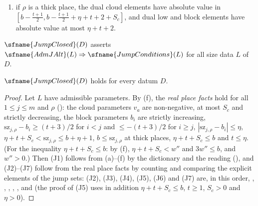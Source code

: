 \begin{definition}
\begin{enumerate}[label=(J\arabic*),leftmargin=*]
dual low elements lie in $[-\eta-\frac{t+1}2,\eta-\frac{t+1}2]$, $0$ is not a dual jump, and the negative dual jumps number $m-j$,
resp.\ $k-1+j$;
\item\label{pf:sh-theta:J7} if $\rho$ is a thick place, the dual cloud elements have absolute value in
$[b-\frac{t+1}2,b-\frac{t+1}2+\eta+t+2+S_c]$, and dual low and block elements have absolute value at most $\eta+t+2$.
\end{enumerate}
$\sfname{JumpClosed}(D)$ asserts $\sfname{AdmJAlt}(L)\Rightarrow\sfname{JumpConditions}(L)$ for all size data $L$ of $D$.
\end{definition}

\begin{theorem}\label{pf:sh-theta:jump}
$\sfname{JumpClosed}(D)$ holds for every datum $D$.
\end{theorem}

\begin{proof}
Let $L$ have admissible parameters. By (f), the \emph{real place facts} hold for all $1\le j\le m$ and $\rho$
(): the cloud parameters $v_a$ are non-negative, at most $S_c$ and strictly
decreasing, the block parameters $b_i$ are strictly increasing, $\mathrm{sz}_{j,\rho}-b_i\ge(t+3)/2$ for $i<j$ and $\le-(t+3)/2$ for
$i\ge j$, $|\mathrm{sz}_{j,\rho}-b_i|\le\eta$, $\eta+t+S_c<\mathrm{sz}_{j,\rho}\le b+\eta+1$, $b\le\mathrm{sz}_{j,\rho}$ at thick places,
$\eta+t+S_c\le b$ and $t\le\eta$. (For the inequality $\eta+t+S_c\le b$: by (f), $\eta+t+S_c<w''$ and $3w''\le b$, and $w''>0$.)
Then (J1) follows from (a)--(f) by the dictionary and the reading
(), and (J2)--(J7) follow from the real place facts by counting
and comparing the explicit elements of the jump sets: (J2), (J3), (J4), (J5), (J6) and (J7) are, in this order,
, , , , , and 
(the proof of (J5) uses in addition $\eta+t+S_c\le b$, $t\ge1$, $S_c>0$ and $\eta>0$).
\end{proof}


